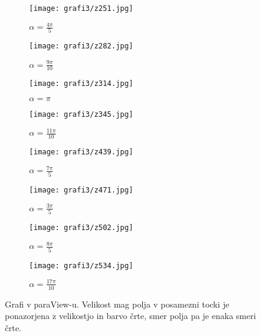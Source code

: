 \documentclass[12pt, a4paper]{article}
\begin{document}
\begin{figure}[h]
  \centering
  \begin{subfigure}[b]{0.49\textwidth}
    \centering
    \texttt{[image: grafi3/z251.jpg]}
    \caption{$\alpha = \frac{4\pi}{5}$}
    \label{graf}
  \end{subfigure}
  \begin{subfigure}[b]{0.49\textwidth}
    \centering
    \texttt{[image: grafi3/z282.jpg]}
    \caption{$\alpha = \frac{9\pi}{10}$}
    \label{graf}
  \end{subfigure}
    \begin{subfigure}[b]{0.49\textwidth}
    \centering
    \texttt{[image: grafi3/z314.jpg]}
    \caption{$\alpha = \pi$}
    \label{graf}
  \end{subfigure}
  \begin{subfigure}[b]{0.49\textwidth}
    \centering
    \texttt{[image: grafi3/z345.jpg]}
    \caption{$\alpha = \frac{11\pi}{10}$}
    \label{graf}
  \end{subfigure}  
  \begin{subfigure}[b]{0.49\textwidth}
    \centering
    \texttt{[image: grafi3/z439.jpg]}
    \caption{$\alpha = \frac{7\pi}{5}$}
    \label{graf}
  \end{subfigure}
  \begin{subfigure}[b]{0.49\textwidth}
    \centering
    \texttt{[image: grafi3/z471.jpg]}
    \caption{$\alpha = \frac{3\pi}{5}$}
    \label{graf}
  \end{subfigure}
    \begin{subfigure}[b]{0.49\textwidth}
    \centering
    \texttt{[image: grafi3/z502.jpg]}
    \caption{$\alpha = \frac{8\pi}{5}$}
    \label{graf}
  \end{subfigure}
  \begin{subfigure}[b]{0.49\textwidth}
    \centering
    \texttt{[image: grafi3/z534.jpg]}
    \caption{$\alpha = \frac{17\pi}{10}$}
    \label{graf}
  \end{subfigure}  
  \caption{Grafi v paraView-u. Velikost mag polja v posamezni tocki je ponazorjena z velikostjo in barvo črte, smer polja pa je enaka smeri črte.}
\end{figure}
\end{document}
